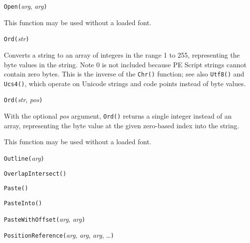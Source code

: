 

\texttt{Open(}\textit{arg}, \textit{arg}\texttt{)}

This function may be used without a loaded font.



\texttt{Ord(}\textit{str}\texttt{)}

Converts a string to an array of integers in the range 1 to 255,
representing the byte values in the string.  Note 0 is not included
because PE Script strings cannot contain zero bytes.
This is the inverse of the \texttt{Chr()}
function; see also \texttt{Utf8()} and \texttt{Ucs4()}, which operate on
Unicode strings and code points instead of byte values.

\texttt{Ord(}\textit{str}, \textit{pos}\texttt{)}

With the optional \textit{pos} argument, \texttt{Ord()} returns a single
integer instead of an array, representing the byte value at the given
zero-based index into the string.

This function may be used without a loaded font.



\texttt{Outline(}\textit{arg}\texttt{)}



\texttt{OverlapIntersect(}\texttt{)}



\texttt{Paste(}\texttt{)}



\texttt{PasteInto(}\texttt{)}



\texttt{PasteWithOffset(}\textit{arg}, \textit{arg}\texttt{)}



\texttt{PositionReference(}\textit{arg}, \textit{arg}, \textit{arg}, \ldots\texttt{)}

